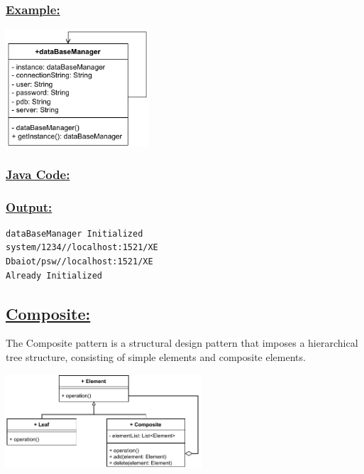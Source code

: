 \subsubsection*{\underline{Example:}}
\begin{center}
\includegraphics[width=0.4\textwidth,height=0.3\textheight]{Chapters/DesignPattern/Singleton/single2.drawio.pdf}
\end{center}


\subsubsection*{\underline{Java Code:}}





\newpage
\subsubsection*{\underline{Output:}}
\begin{lstlisting}[style=cmd]
dataBaseManager Initialized
system/1234//localhost:1521/XE
Dbaiot/psw//localhost:1521/XE
Already Initialized
\end{lstlisting}

\vspace{0.5cm}
\subsection*{\underline{Composite:}}
The Composite pattern is a structural design pattern that imposes a
hierarchical tree structure, consisting of simple elements and composite elements.

\begin{center}
\includegraphics[width=0.55\textwidth,height=0.35\textheight]{Chapters/DesignPattern/Composite/comp1.drawio.pdf}
\end{center}


